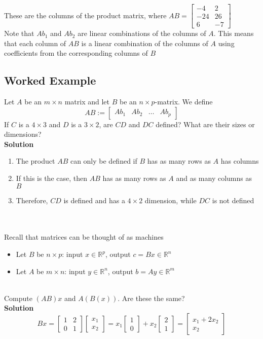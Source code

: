 These are the columns of the product matrix, where $AB = \begin{bmatrix}
  -4 & 2 \\
  -24 & 26 \\
  6 & -7
\end{bmatrix}$
\\[8pt]
Note that $Ab_1$ and $Ab_2$ are linear combinations of the columns of $A$. This 
means that each column of $AB$ is a linear combination of the columns of $A$ using
coefficients from the corresponding columns of $B$
\subsection{Worked Example}
Let $A$ be an $m \times n$ matrix and let $B$ be an $n \times p$-matrix. We define
\[
  AB := \begin{bmatrix}
    Ab_1 & Ab_2 & \dots & Ab_p
  \end{bmatrix}
\]
If $C$ is a $4 \times 3$ and $D$ is a $3 \times 2$, are $CD$ and $DC$ defined?
What are their sizes or dimensions?
\\[8pt]
\textbf{Solution}
\begin{enumerate}
  \item The product $AB$ can only be defined if $B$ has as many rows as $A$ has 
    columns
  \item If this is the case, then $AB$ has as many rows as $A$ and as many columns 
    as $B$
  \item Therefore, $CD$ is defined and has a $4 \times 2$ dimension, while 
    $DC$ is not defined
\end{enumerate}
\\\\
Recall that matrices can be thought of as machines
\begin{itemize}
  \item Let $B$ be $n \times p$: input $x \in \mathbb{R}^p$, output $c = Bx \in 
  \mathbb{R}^n$
\item Let $A$ be $m \times n$: input $y \in \mathbb{R}^n$, output $b = Ay \in 
  \mathbb{R}^m$
\end{itemize}
\\[8pt]
Compute $(AB)x$ and $A(B(x))$. Are these the same?
\\[8pt]
\textbf{Solution}
\[
  Bx = \begin{bmatrix}
    1 & 2 \\
    0 & 1
  \end{bmatrix} \begin{bmatrix}
    x_1 \\
    x_2
  \end{bmatrix} = x_1 \begin{bmatrix}
    1 \\ 0
  \end{bmatrix} + x_2 \begin{bmatrix}
    2 \\ 1
  \end{bmatrix} = \begin{bmatrix}
    x_1 + 2x_2 \\
    x_2
  \end{bmatrix}
\]
